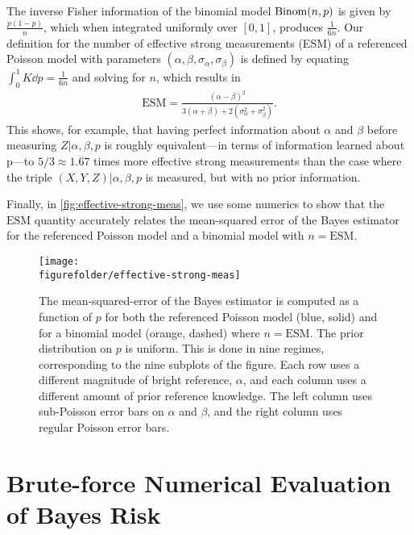 \documentclass[aps,nofootinbib,twocolumn,superscriptaddress]{revtex4}
\newcommand{\figurefolder}{../fig}
\newcommand{\ESM}{\text{ESM}}
\begin{document}
The inverse Fisher information of the binomial model $\operatorname{Binom}(n,p)$
is given by $\frac{p(1-p)}{n}$, which when integrated uniformly over
$[0,1]$, produces $\frac{1}{6n}$.
Our definition for the number of effective strong measurements (ESM)
of a referenced Poisson model with parameters
$(\alpha,\beta,\sigma_\alpha,\sigma_\beta)$ is defined by
equating $\int_0^1 K\dd p=\frac{1}{6n}$ and solving for $n$,
which results in
\begin{align}
   \ESM = \frac{
            (\alpha-\beta)^2
        }{
            3(\alpha+\beta)+2\left(\sigma_\alpha^2+\sigma_\beta^2\right)
        }.
\end{align}
This shows, for example,
that having perfect information about $\alpha$ and $\beta$
before measuring $Z|\alpha,\beta,p$ is roughly equivalent---in terms
of information learned about p---to
$5/3\approx 1.67$ times more effective strong measurements
than the case where the triple $(X,Y,Z)|\alpha,\beta,p$ is
measured, but with no prior information.

Finally, in \autoref{fig:effective-strong-meas}, we use some numerics
to show that the $\ESM$
quantity accurately relates the mean-squared error of the Bayes estimator
for the referenced Poisson model and a binomial model with $n=\ESM$.

\begin{figure}
    \texttt{[image: \\figurefolder/effective-strong-meas]}
    \caption{The mean-squared-error of the Bayes estimator is computed
    as a function of $p$
    for both the referenced Poisson model (blue, solid) and for a binomial model
    (orange, dashed) where $n=\ESM$.
    The prior distribution on $p$ is uniform.
    This is done in nine regimes, corresponding to the nine subplots of the figure.
    Each row uses a different magnitude of bright reference, $\alpha$,
    and each column uses a different amount of prior reference knowledge.
    The left column uses sub-Poisson error bars on $\alpha$ and $\beta$,
    and the right column uses regular Poisson error bars.}
    \label{fig:effective-strong-meas}
\end{figure}

\section{Brute-force Numerical Evaluation of Bayes Risk}
\label{apx:brute-force-bayes-risk}
\end{document}
